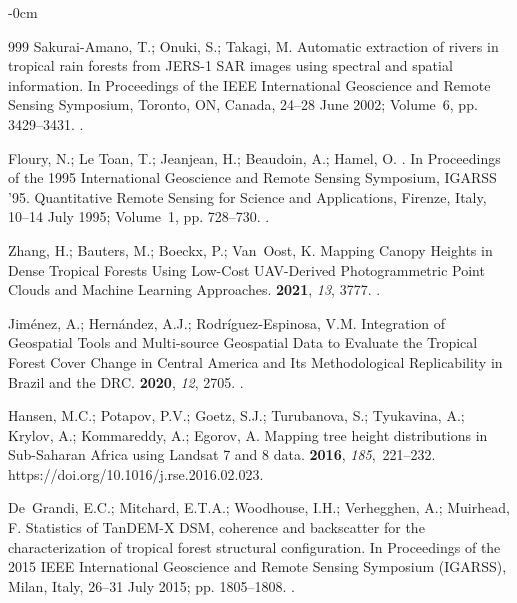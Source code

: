 \documentclass[applsci,article,accept,pdftex,moreauthors]{Definitions/mdpi}
\begin{document}
\begin{adjustwidth}{-\extralength}{0cm}
\begin{thebibliography}{999}
Sakurai-Amano, T.; Onuki, S.; Takagi, M.
\newblock Automatic extraction of rivers in tropical rain forests from JERS-1
  SAR images using spectral and spatial information.
\newblock In Proceedings of the IEEE International Geoscience and Remote
  Sensing Symposium, {Toronto, ON, Canada, 24--28 June 2002;}  Volume~6, pp. 3429--3431.
.

Floury, N.; {Le Toan}, T.; Jeanjean, H.; Beaudoin, A.; Hamel, O.
.
\newblock In Proceedings of the 1995 International Geoscience and Remote
  Sensing Symposium, IGARSS '95. Quantitative Remote Sensing for Science and
  Applications, {Firenze, Italy, 10--14 July 1995;}  Volume~1, pp. 728--730.
.

Zhang, H.; Bauters, M.; Boeckx, P.; Van~Oost, K.
\newblock Mapping Canopy Heights in Dense Tropical Forests Using Low-Cost
  UAV-Derived Photogrammetric Point Clouds and Machine Learning Approaches.
 {\bf 2021}, {\em 13}, 3777.
.

Jiménez, A.; Hernández, A.J.; Rodríguez-Espinosa, V.M.
\newblock Integration of Geospatial Tools and Multi-source Geospatial Data to
  Evaluate the Tropical Forest Cover Change in Central America and Its
  Methodological Replicability in Brazil and the DRC.
 {\bf 2020}, {\em 12}, 2705.
.

Hansen, M.C.; Potapov, P.V.; Goetz, S.J.; Turubanova, S.; Tyukavina, A.;
  Krylov, A.; Kommareddy, A.; Egorov, A.
\newblock Mapping tree height distributions in Sub-Saharan Africa using Landsat
  7 and 8 data.
 {\bf 2016}, {\em 185},~221--232. {{https://doi.org/10.1016/j.rse.2016.02.023}}.

De~Grandi, E.C.; Mitchard, E.T.A.; Woodhouse, I.H.; Verhegghen, A.; Muirhead,
  F.
\newblock Statistics of TanDEM-X DSM, coherence and backscatter for the
  characterization of tropical forest structural configuration.
\newblock In Proceedings of the 2015 IEEE International Geoscience and Remote
  Sensing Symposium (IGARSS),   {Milan, Italy, 26--31 July 2015;}  pp. 1805--1808.
.


\end{thebibliography}
\end{adjustwidth}
\end{document}
